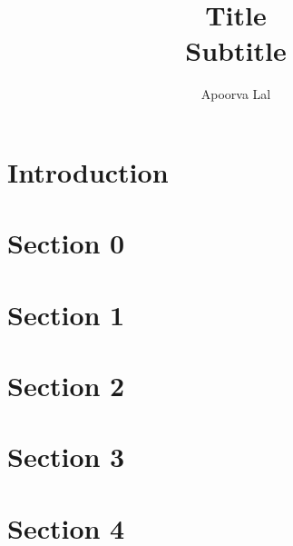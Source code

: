 \documentclass[a4paper, 12pt]{article}
\title{Title \\
	\large Subtitle}
\author{Apoorva Lal}
\begin{document}
\begin{titlingpage}
    \maketitle
    \begin{abstract}
        \lipsum[4]
    \end{abstract}
\end{titlingpage}


\section*{Introduction}


\cite{Deatonanalysishouseholdsurveys1997}

\parencite{Acemoglucolonialoriginscomparative2001}


\section{Section 0}
\lipsum[2]

\section{Section 1}
\lipsum[3]

\section{Section 2}
\lipsum[3]

\section{Section 3}
\lipsum[4]

\section{Section 4}
\lipsum[7]

\printbibliography
\end{document}
